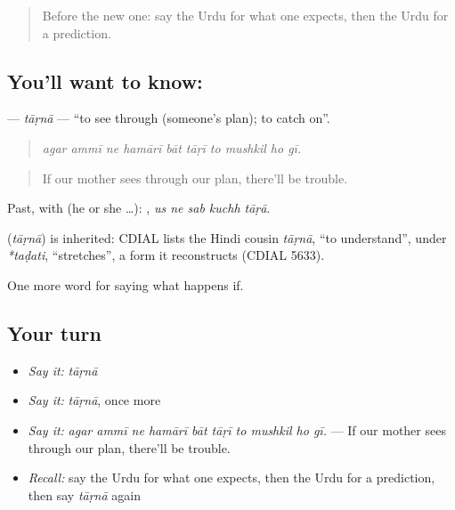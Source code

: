 \label{lesson:UR-C543-tarna}



\begin{quote}
Before the new one: say the Urdu for what one expects, then the Urdu for a prediction.
\end{quote}

\subsection*{You'll want to know: }
\textbf{} — \emph{tāṛnā} — \textquotedblleft{}to see through (someone's plan); to catch on\textquotedblright{}.

\begin{quote}
         
\end{quote}

\begin{quote}
\emph{agar ammī ne hamārī bāt tāṛī to mushkil ho gī.}
\end{quote}

\begin{quote}
If our mother sees through our plan, there'll be trouble.
\end{quote}

Past, with  (he or she …):     , \emph{us ne sab kuchh tāṛā}.

\begin{cousinweb}
\textbf{} (\emph{tāṛnā}) is inherited: CDIAL lists the Hindi cousin \emph{tāṛnā}, \textquotedblleft{}to understand\textquotedblright{}, under \emph{*taḍati}, \textquotedblleft{}stretches\textquotedblright{}, a form it reconstructs (CDIAL 5633).
\end{cousinweb}

\begin{grammarlens}[title={What you've built}]
One more word for saying what happens if.
\end{grammarlens}

\subsection*{Your turn}
\begin{itemize}
\raggedright
  \item \emph{Say it:} \emph{tāṛnā}
  \item \emph{Say it:} \emph{tāṛnā}, once more
  \item \emph{Say it:} \emph{agar ammī ne hamārī bāt tāṛī to mushkil ho gī.} — If our mother sees through our plan, there'll be trouble.
  \item \emph{Recall:} say the Urdu for what one expects, then the Urdu for a prediction, then say \emph{tāṛnā} again
\end{itemize}

